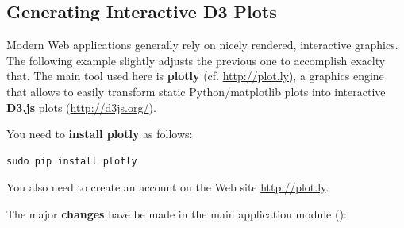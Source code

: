 \documentclass[letterpaper,10pt,english]{sphinxmanual}
\begin{document}
\subsection{Generating Interactive D3 Plots}
\label{03_web_apps:generating-interactive-d3-plots}
Modern Web applications generally rely on nicely rendered, interactive graphics. The following example slightly adjusts the previous one to accomplish exaclty that. The main tool used here is \textbf{plotly} (cf. \href{http://plot.ly}{http://plot.ly}), a graphics engine that allows to easily transform static Python/matplotlib plots into interactive \textbf{D3.js} plots (\href{http://d3js.org/}{http://d3js.org/}).

You need to \textbf{install plotly} as follows:

\begin{Verbatim}[commandchars=\\\{\}]
sudo pip install plotly
\end{Verbatim}

You also need to create an account on the Web site \href{http://plot.ly}{http://plot.ly}.

The major \textbf{changes} have be made in the main application module ():
\end{document}
